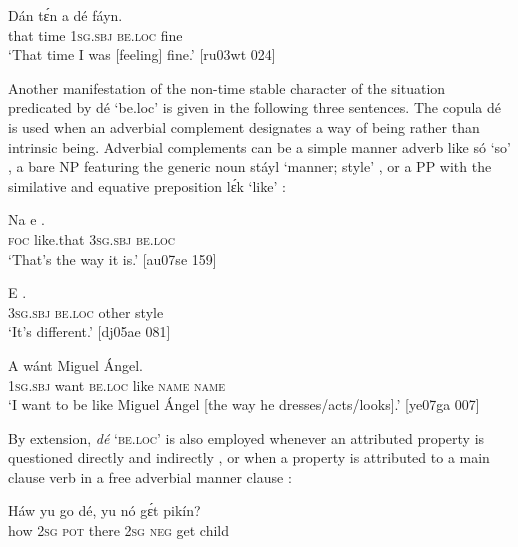 \ea%
    \label{ex:key:786}
    \gll Dán  tɛ́n  a    dé    fáyn.\\
that  time  \textsc{1sg.sbj}  \textsc{be.loc}  fine\\

\glt ‘That time I was [feeling] fine.’ [ru03wt 024]
\z

Another manifestation of the non-time stable character of the situation predicated by dé ‘be.loc’ is given in the following three sentences. The copula dé is used when an adverbial complement designates a way of being rather than intrinsic being. Adverbial complements can be a simple manner adverb like só ‘so’ , a bare NP featuring the generic noun stáyl ‘manner; style’ , or a PP with the similative{\fff} and equative preposition lɛ́k ‘like’ :


\ea%
    \label{ex:key:787}
    \gll Na      e    .\\
\textsc{foc}  like.that  \textsc{3sg.sbj}  \textsc{be.loc}\\

\glt ‘That’s the way it is.’ [au07se 159]
\z


\ea%
    \label{ex:key:788}
    \gll E            .\\
\textsc{3sg.sbj}  \textsc{be.loc}  other  style\\

\glt ‘It’s different.’ [dj05ae 081]
\z


\ea%
    \label{ex:key:789}
    \gll \MakeUppercase{A}   wánt        Miguel  Ángel.\\
\textsc{1sg.sbj}  want  \textsc{be.loc}  like  \textsc{name}  \textsc{name}\\

\glt ‘I want to be like Miguel Ángel [the way he dresses/acts/looks].’ [ye07ga 007]
\z

By extension, \textit{dé} ‘\textsc{be.loc}’ is also employed whenever an attributed property is questioned directly  and indirectly , or when a property is attributed to a main clause verb in a free adverbial manner clause :


\ea%
    \label{ex:key:790}
    \gll Háw    yu  go  dé,    yu  nó  gɛ́t  pikín?\\
how    \textsc{2sg}  \textsc{pot}  there  \textsc{2sg}  \textsc{neg}  get  child\\


